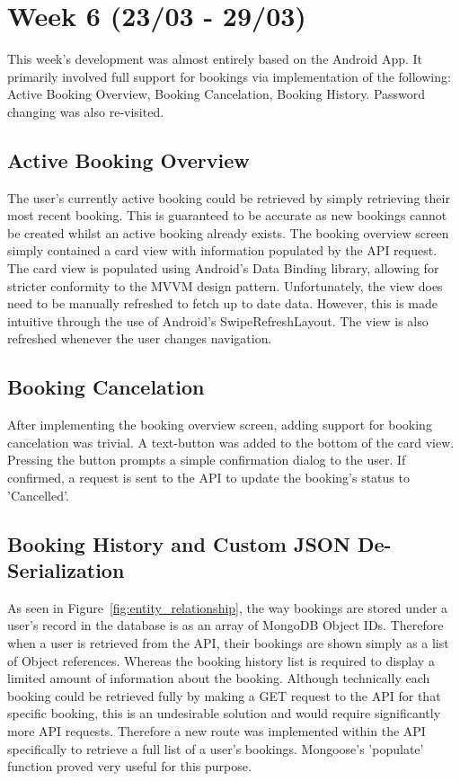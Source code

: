 \section{Week 6 (23/03 - 29/03)}
This week's development was almost entirely based on the Android App. It primarily involved full support for bookings via implementation of the following: Active Booking Overview, Booking Cancelation, Booking History. Password changing was also re-visited.

\subsection{Active Booking Overview}
The user's currently active booking could be retrieved by simply retrieving their most recent booking. This is guaranteed to be accurate as new bookings cannot be created whilst an active booking already exists. The booking overview screen simply contained a card view with information populated by the API request. The card view is populated using Android's Data Binding library, allowing for stricter conformity to the MVVM design pattern.  Unfortunately, the view does need to be manually refreshed to fetch up to date data. However, this is made intuitive through the use of Android's SwipeRefreshLayout. The view is also refreshed whenever the user changes navigation.

\subsection{Booking Cancelation}
After implementing the booking overview screen, adding support for booking cancelation was trivial. A text-button was added to the bottom of the card view. Pressing the button prompts a simple confirmation dialog to the user. If confirmed, a request is sent to the API to update the booking's status to 'Cancelled'.

\subsection{Booking History and Custom JSON De-Serialization}
As seen in Figure~\ref{fig:entity_relationship}, the way bookings are stored under a user's record in the database is as an array of MongoDB Object IDs. Therefore when a user is retrieved from the API, their bookings are shown simply as a list of Object references. Whereas the booking history list is required to display a limited amount of information about the booking. Although technically each booking could be retrieved fully by making a GET request to the API for that specific booking, this is an undesirable solution and would require significantly more API requests. Therefore a new route was implemented within the API specifically to retrieve a full list of a user's bookings. Mongoose's 'populate' function proved very useful for this purpose. 

